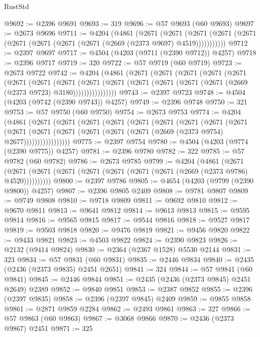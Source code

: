 \begin{lexlean}{RustStd}
\begin{coremodule}
@9692 := @2396 @9691
@9693 := 319
@9696 := @57 @9693 (@60 @9693)
@9697 := @2673 @9696
@9711 := @4204
    (@4861
      (@2671
        (@2671
          (@2671 (@2671 (@2671 (@2671 (@2671 (@2671 (@2671 (@2669 (@2373 @9697) @4519)))))))))))
@9712 := @2397 @9697
@9717 := @4504 (@4203 (@9711 (@2390 @9712)) @4257)
@9718 := @2396 @9717
@9719 := 320
@9722 := @57 @9719 (@60 @9719)
@9723 := @2673 @9722
@9742 := @4204
    (@4861
      (@2671
        (@2671
          (@2671
            (@2671
              (@2671
                (@2671
                  (@2671
                    (@2671
                      (@2671
                        (@2671
                          (@2671 (@2671 (@2671 (@2671 (@2669 (@2373 @9723) @3180))))))))))))))))
@9743 := @2397 @9723
@9748 := @4504 (@4203 (@9742 (@2390 @9743)) @4257)
@9749 := @2396 @9748
@9750 := 321
@9753 := @57 @9750 (@60 @9750)
@9754 := @2673 @9753
@9774 := @4204
    (@4861
      (@2671
        (@2671
          (@2671
            (@2671
              (@2671
                (@2671
                  (@2671
                    (@2671
                      (@2671
                        (@2671
                          (@2671
                            (@2671 (@2671 (@2671 (@2671 (@2669 (@2373 @9754) @2677)))))))))))))))))
@9775 := @2397 @9754
@9780 := @4504 (@4203 (@9774 (@2390 @9775)) @4257)
@9781 := @2396 @9780
@9782 := 322
@9785 := @57 @9782 (@60 @9782)
@9786 := @2673 @9785
@9799 := @4204
    (@4861
      (@2671 (@2671 (@2671 (@2671 (@2671 (@2671 (@2671 (@2671 (@2669 (@2373 @9786) @4520))))))))))
@9800 := @2397 @9786
@9805 := @4654 (@4203 (@9799 (@2390 @9800)) @4257)
@9807 := @2396 @9805 @2409
@9808 := @9781 @9807
@9809 := @9749 @9808
@9810 := @9718 @9809
@9811 := @9692 @9810
@9812 := @9670 @9811
@9813 := @9641 @9812
@9814 := @9613 @9813
@9815 := @9595 @9814
@9816 := @9565 @9815
@9817 := @9544 @9816
@9818 := @9527 @9817
@9819 := @9503 @9818
@9820 := @9476 @9819
@9821 := @9456 @9820
@9822 := @9433 @9821
@9823 := @4503 @9822
@9824 := @2390 @9823
@9826 := @2132 (@9414 @9824)
@9830 := @2364 (@2367 @1528) @5530 @2144
@9831 := 323
@9834 := @57 @9831 (@60 @9831)
@9835 := @2446 @9834
@9840 := @2435 (@2436 (@2373 @9835) @2451 @2651)
@9841 := 324
@9844 := @57 @9841 (@60 @9841)
@9845 := @2446 @9844
@9851 := @2435 (@2436 (@2373 @9845) @2451 @2649) @2389
@9852 := @9840 @9851
@9853 := @2387 @9852
@9855 := @2396 (@2397 @9835)
@9858 := @2396 (@2397 @9845) @2409
@9859 := @9855 @9858
@9861 := @2871 @9859 @2284
@9862 := @2493 @9861
@9863 := 327
@9866 := @57 @9863 (@60 @9863)
@9867 := @3068 @9866
@9870 := @2436 (@2373 @9867) @2451
@9871 := 325

\end{coremodule}
\end{lexlean}

